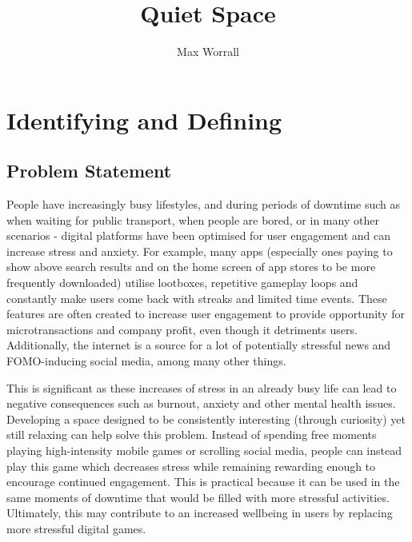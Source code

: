 \documentclass[14pt]{article}
\author{Max Worrall}
\title{Quiet Space}
\begin{document}
\maketitle
\tableofcontents
\pagebreak


\section{Identifying and Defining}

\subsection{Problem Statement}
People have increasingly busy lifestyles, and during periods of downtime such as when waiting for public transport, when people are bored, or in many other scenarios - digital platforms have been optimised for user engagement and can increase stress and anxiety. For example, many apps (especially ones paying to show above search results and on the home screen of app stores to be more frequently downloaded) utilise lootboxes, repetitive gameplay loops and constantly make users come back with streaks and limited time events. These features are often created to increase user engagement to provide opportunity for microtransactions and company profit, even though it detriments users. Additionally, the internet is a source for a lot of potentially stressful news and FOMO-inducing social media, among many other things.

This is significant as these increases of stress in an already busy life can lead to negative consequences such as burnout, anxiety and other mental health issues. Developing a space designed to be consistently interesting (through curiosity) yet still relaxing can help solve this problem. Instead of spending free moments playing high-intensity mobile games or scrolling social media, people can instead play this game which decreases stress while remaining rewarding enough to encourage continued engagement. This is practical because it can be used in the same moments of downtime that would be filled with more stressful activities. Ultimately, this may contribute to an increased wellbeing in users by replacing more stressful digital games.
\end{document}
